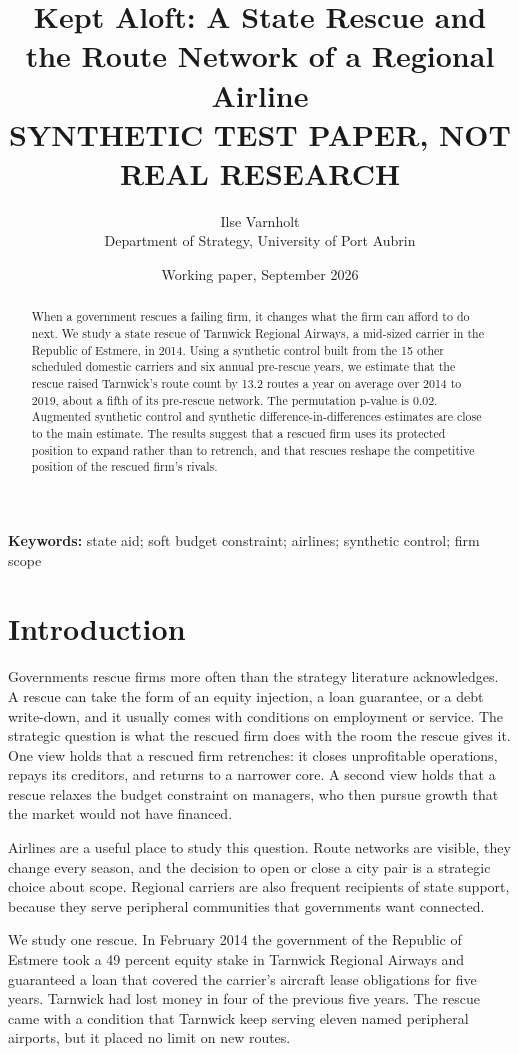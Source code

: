 \documentclass[12pt]{article}
\title{Kept Aloft: A State Rescue and the Route Network of a Regional Airline\\[6pt]
\normalsize\textbf{SYNTHETIC TEST PAPER, NOT REAL RESEARCH}}
\author{Ilse Varnholt\\Department of Strategy, University of Port Aubrin}
\date{Working paper, September 2026}
\begin{document}
\maketitle

\begin{abstract}
\noindent
When a government rescues a failing firm, it changes what the firm can afford to do next. We study a state rescue of Tarnwick Regional Airways, a mid-sized carrier in the Republic of Estmere, in 2014. Using a synthetic control built from the 15 other scheduled domestic carriers and six annual pre-rescue years, we estimate that the rescue raised Tarnwick's route count by 13.2 routes a year on average over 2014 to 2019, about a fifth of its pre-rescue network. The permutation p-value is 0.02. Augmented synthetic control and synthetic difference-in-differences estimates are close to the main estimate. The results suggest that a rescued firm uses its protected position to expand rather than to retrench, and that rescues reshape the competitive position of the rescued firm's rivals.
\end{abstract}

\noindent\textbf{Keywords:} state aid; soft budget constraint; airlines; synthetic control; firm scope

\newpage

\section{Introduction}

Governments rescue firms more often than the strategy literature acknowledges. A rescue can take the form of an equity injection, a loan guarantee, or a debt write-down, and it usually comes with conditions on employment or service. The strategic question is what the rescued firm does with the room the rescue gives it. One view holds that a rescued firm retrenches: it closes unprofitable operations, repays its creditors, and returns to a narrower core. A second view holds that a rescue relaxes the budget constraint on managers, who then pursue growth that the market would not have financed.

Airlines are a useful place to study this question. Route networks are visible, they change every season, and the decision to open or close a city pair is a strategic choice about scope. Regional carriers are also frequent recipients of state support, because they serve peripheral communities that governments want connected.

We study one rescue. In February 2014 the government of the Republic of Estmere took a 49 percent equity stake in Tarnwick Regional Airways and guaranteed a loan that covered the carrier's aircraft lease obligations for five years. Tarnwick had lost money in four of the previous five years. The rescue came with a condition that Tarnwick keep serving eleven named peripheral airports, but it placed no limit on new routes.
\end{document}

